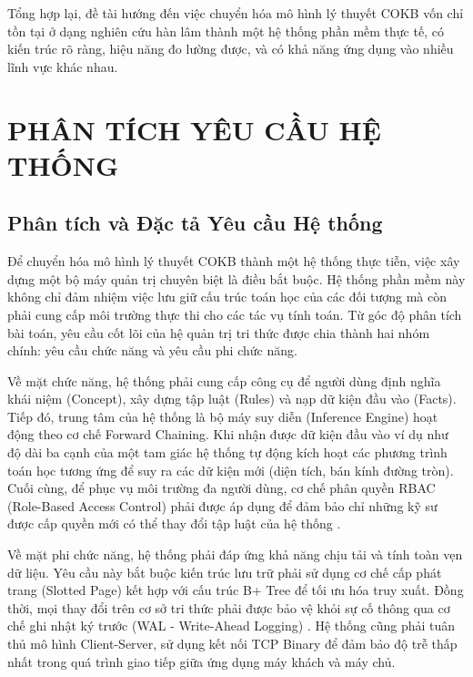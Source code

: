 \documentclass[13pt,a4paper,oneside]{extreport}
\begin{document}
Tổng hợp lại, đề tài hướng đến việc chuyển hóa mô hình lý thuyết COKB  vốn chỉ tồn tại ở dạng nghiên cứu hàn lâm  thành một hệ thống phần mềm thực tế, có kiến trúc rõ ràng, hiệu năng đo lường được, và có khả năng ứng dụng vào nhiều lĩnh vực khác nhau.


\clearpage

\chapter{PHÂN TÍCH YÊU CẦU HỆ THỐNG}

\section{Phân tích và Đặc tả Yêu cầu Hệ thống}


Để chuyển hóa mô hình lý thuyết COKB thành một hệ thống thực tiễn, việc xây dựng một bộ máy quản trị chuyên biệt là điều bắt buộc. Hệ thống phần mềm này không chỉ đảm nhiệm việc lưu giữ cấu trúc toán học của các đối tượng mà còn phải cung cấp môi trường thực thi cho các tác vụ tính toán. Từ góc độ phân tích bài toán, yêu cầu cốt lõi của hệ quản trị tri thức được chia thành hai nhóm chính: yêu cầu chức năng và yêu cầu phi chức năng.


Về mặt chức năng, hệ thống phải cung cấp công cụ để người dùng định nghĩa khái niệm (Concept), xây dựng tập luật (Rules) và nạp dữ kiện đầu vào (Facts). Tiếp đó, trung tâm của hệ thống là bộ máy suy diễn (Inference Engine) hoạt động theo cơ chế Forward Chaining. Khi nhận được dữ kiện đầu vào  ví dụ như độ dài ba cạnh của một tam giác  hệ thống tự động kích hoạt các phương trình toán học tương ứng để suy ra các dữ kiện mới (diện tích, bán kính đường tròn). Cuối cùng, để phục vụ môi trường đa người dùng, cơ chế phân quyền RBAC (Role-Based Access Control) phải được áp dụng để đảm bảo chỉ những kỹ sư được cấp quyền mới có thể thay đổi tập luật của hệ thống \cite{Musen_Protege}.


Về mặt phi chức năng, hệ thống phải đáp ứng khả năng chịu tải và tính toàn vẹn dữ liệu. Yêu cầu này bắt buộc kiến trúc lưu trữ phải sử dụng cơ chế cấp phát trang (Slotted Page) kết hợp với cấu trúc B+ Tree để tối ưu hóa truy xuất. Đồng thời, mọi thay đổi trên cơ sở tri thức phải được bảo vệ khỏi sự cố thông qua cơ chế ghi nhật ký trước (WAL - Write-Ahead Logging) \cite{DatabaseSystems}. Hệ thống cũng phải tuân thủ mô hình Client-Server, sử dụng kết nối TCP Binary để đảm bảo độ trễ thấp nhất trong quá trình giao tiếp giữa ứng dụng máy khách và máy chủ.
\end{document}
